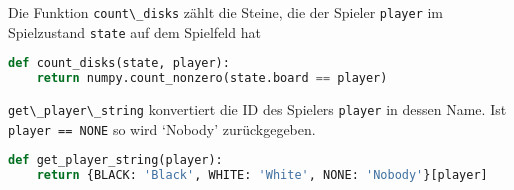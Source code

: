 Die Funktion \passthrough{\lstinline!count\_disks!} zählt die Steine,
die der Spieler \passthrough{\lstinline!player!} im Spielzustand
\passthrough{\lstinline!state!} auf dem Spielfeld hat

\begin{lstlisting}[language=Python]
def count_disks(state, player):
    return numpy.count_nonzero(state.board == player)
\end{lstlisting}

\passthrough{\lstinline!get\_player\_string!} konvertiert die ID des
Spielers \passthrough{\lstinline!player!} in dessen Name. Ist
\passthrough{\lstinline!player == NONE!} so wird `Nobody' zurückgegeben.

\begin{lstlisting}[language=Python]
def get_player_string(player):
    return {BLACK: 'Black', WHITE: 'White', NONE: 'Nobody'}[player]
\end{lstlisting}
